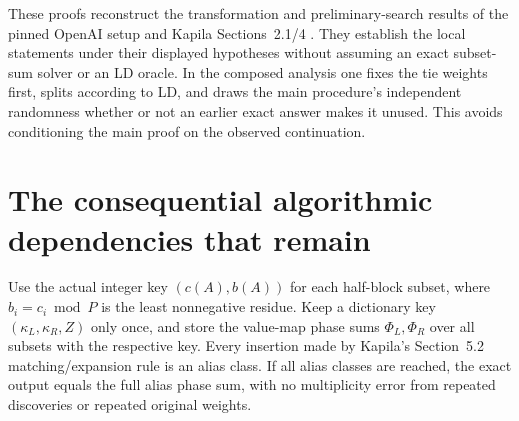 These proofs reconstruct the transformation and preliminary-search
results of the pinned OpenAI setup and Kapila Sections~2.1/4
\cite{openai,kapila}. They establish the local statements under their
displayed hypotheses without assuming an exact subset-sum solver or
an LD oracle. In the composed analysis one fixes the tie weights first,
splits according to LD, and draws the main procedure's independent
randomness whether or not an earlier exact answer makes it unused.
This avoids conditioning the main proof on the observed continuation.

\section{The consequential algorithmic dependencies that remain}\label{sec:remaining}
\begin{proposition}\label{prop:alias-sound}
Use the actual integer key $(c(A),b(A))$ for each half-block subset,
where $b_i=c_i\bmod P$ is the least nonnegative residue. Keep a
dictionary key $(\kappa_L,\kappa_R,Z)$ only once, and store the value-map
phase sums $\Phi_L,\Phi_R$ over all subsets with the respective key.
Every insertion made by Kapila's Section~5.2 matching/expansion rule
is an alias class. If all alias classes are reached, the exact output
equals the full alias phase sum, with no multiplicity error from
repeated discoveries or repeated original weights.
\end{proposition}
